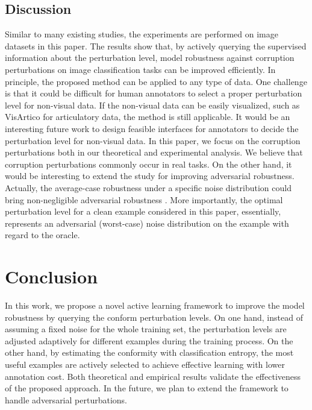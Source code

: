 \documentclass[letterpaper]{article} %
\begin{document}
\vspace{-1.53mm}
\subsection{Discussion}

Similar to many existing studies, the experiments are performed on image datasets in this paper. The results show that, by actively querying the supervised information about the perturbation level, model robustness against corruption perturbations on image classification tasks can be improved efficiently. In principle, the proposed method can be applied to any type of data. One challenge is that it could be difficult for human annotators to select a proper perturbation level for non-visual data. If the non-visual data can be easily visualized, such as VisArtico \cite{ouni2012visartico} for articulatory data, the method is still applicable. It would be an interesting future work to design feasible interfaces for annotators to decide the perturbation level for non-visual data.  In this paper, we focus on the corruption perturbations both in our theoretical and experimental analysis. We believe that corruption perturbations commonly occur in real tasks. On the other hand, it would be interesting to extend the study for improving adversarial robustness. Actually, the average-case robustness under a specific noise distribution could bring non-negligible adversarial robustness \cite{wong2020learning}. More importantly, the optimal perturbation level for a clean example considered in this paper, essentially, represents an adversarial (worst-case) noise distribution on the example with regard to the oracle.


\vspace{-1.67mm}
\section{Conclusion}

In this work, we propose a novel active learning framework to improve the model robustness by querying the conform perturbation levels. On one hand, instead of assuming a fixed noise for the whole training set, the perturbation levels are adjusted adaptively for different examples during the training process. On the other hand, by estimating the conformity with classification entropy, the most useful examples are actively selected to achieve effective learning with lower annotation cost. Both theoretical and empirical results validate the effectiveness of the proposed approach. In the future, we plan to extend the framework to handle adversarial perturbations.
\end{document}
